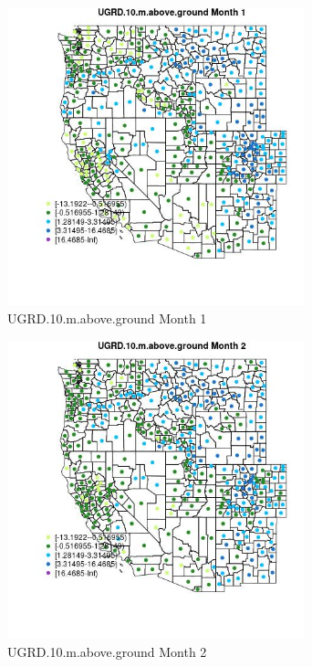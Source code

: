 \begin{figure} 
\centering  
\includegraphics[width=0.77\textwidth]{Code_Outputs/df_report_ML_predictors_CountyCentroid_Locations_Dates_2008-01-01to2018-12-31_MapObsMo1UGRD10maboveground.jpg} 
\caption{\label{fig:df_report_ML_predictors_CountyCentroid_Locations_Dates_2008-01-01to2018-12-31MapObsMo1UGRD10maboveground}UGRD.10.m.above.ground Month 1} 
\end{figure} 
 

\begin{figure} 
\centering  
\includegraphics[width=0.77\textwidth]{Code_Outputs/df_report_ML_predictors_CountyCentroid_Locations_Dates_2008-01-01to2018-12-31_MapObsMo2UGRD10maboveground.jpg} 
\caption{\label{fig:df_report_ML_predictors_CountyCentroid_Locations_Dates_2008-01-01to2018-12-31MapObsMo2UGRD10maboveground}UGRD.10.m.above.ground Month 2} 
\end{figure} 
 

